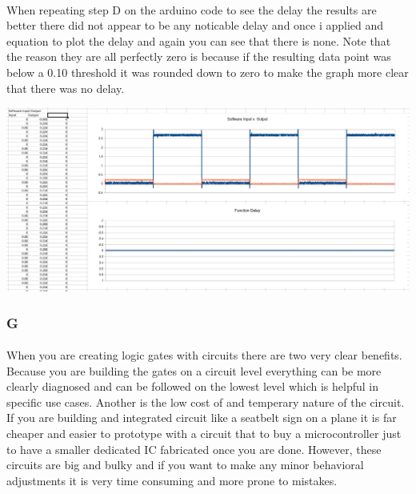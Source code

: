 \documentclass[12pt]{article}
\begin{document}
				\paragraph{}
					When repeating step D on the arduino code to see the delay the results are better there did not appear to be any noticable delay and once
					i applied and equation to plot the delay and again you can see that there is none.  Note that the reason they are all perfectly zero is because
					if the resulting data point was below a 0.10 threshold it was rounded down to zero to make the graph more clear that there was no delay.

					\begin{center}
						\includegraphics[scale=0.2]{nodelay.png}\\
					\end{center}
			
			\subsubsection{G}
				\paragraph{}
					When you are creating logic gates with circuits there are two very clear benefits.  Because you are building the gates on a circuit level everything
					can be more clearly diagnosed and can be followed on the lowest level which is helpful in specific use cases.  Another is the low cost of and 
					temperary nature of the circuit.  If you are building and integrated circuit like a seatbelt sign on a plane it is far cheaper and easier to prototype 
					with a circuit that to buy a microcontroller just to have a smaller dedicated IC fabricated once you are done.  However, these circuits are big and 
					bulky and if you want to make any minor behavioral adjustments it is very time consuming and more prone to mistakes.
\end{document}
